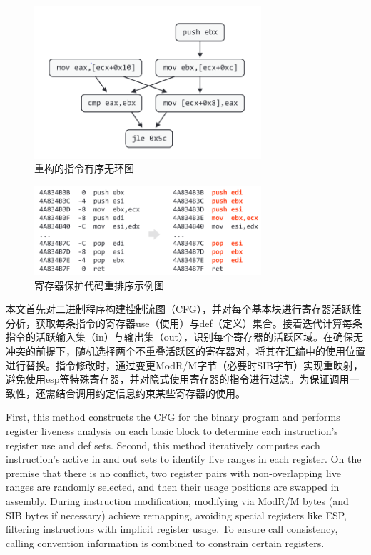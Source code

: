 \begin{figure}[hbt]
	\centering
	\includegraphics[width=0.75\textwidth]{figures/4.4}
	\caption{重构的指令有序无环图}\label{fig:4.4}
\end{figure}

\begin{figure}[hbt]
	\centering
	\includegraphics[width=0.75\textwidth]{figures/4.5}
	\caption{寄存器保护代码重排序示例图}\label{fig:4.5}
\end{figure}

本文首先对二进制程序构建控制流图（CFG），并对每个基本块进行寄存器活跃性分析，获取每条指令的寄存器use（使用）与def（定义）集合。接着迭代计算每条指令的活跃输入集（in）与输出集（out），识别每个寄存器的活跃区域。在确保无冲突的前提下，随机选择两个不重叠活跃区的寄存器对，将其在汇编中的使用位置进行替换。指令修改时，通过变更ModR/M字节（必要时SIB字节）实现重映射，避免使用esp等特殊寄存器，并对隐式使用寄存器的指令进行过滤。为保证调用一致性，还需结合调用约定信息约束某些寄存器的使用。

First, this method constructs the CFG for the binary program and performs register liveness analysis on each basic block to determine each instruction's register use and def sets. Second, this method iteratively computes each instruction's active in and out sets to identify live ranges in each register. On the premise that there is no conflict, two register pairs with non-overlapping live ranges are randomly selected, and then their usage positions are swapped in assembly. During instruction modification, modifying via ModR/M bytes (and SIB bytes if necessary) achieve remapping, avoiding special registers like ESP, filtering instructions with implicit register usage. To ensure call consistency, calling convention information is combined to constrain certain registers.

